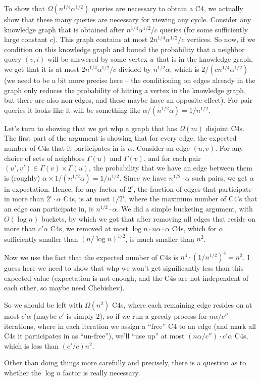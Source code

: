 To show that $\Omega(n^{1/4} \alpha^{1/2})$ queries are necessary to obtain a C4, we actually show that these many queries are necessary for viewing any cycle. Consider any knowledge graph that is obtained after $n^{1/4} \alpha^{1/2}/c$ queries (for some sufficiently large constant $c$). This graph contains at most $2 n^{1/4} \alpha^{1/2}/c$ vertices. So now, if we condition on this knowledge graph and bound the probability that a neighbor query $(v,i)$ will be answered by some vertex $u$ that is in the knowledge graph, we get that it is at most $2 n^{1/4} \alpha^{1/2}/c$ divided by $n^{1/2}\alpha$, which is $2/(cn^{1/4}\alpha^{1/2})$ (we need to be a bit more precise here -- the conditioning on edges already in the graph only reduces the probability of hitting a vertex in the knowledge graph, but there are also non-edges, and these maybe have an opposite effect). For pair queries it looks like it will be something like $\alpha /(n^{1/2}\alpha) = 1/n^{1/2}$.

Let's turn to showing that we get whp a graph that has $\Omega(m)$ disjoint C4s. The first part of the argument is showing that for every edge, the expected number of C4s that it participates in is $\alpha$.
Consider an edge $(u,v)$. For any choice of sets of neighbors $\Gamma(u)$ and $\Gamma(v)$, and for each pair $(u',v') \in \Gamma(v) \times \Gamma(u)$, the probability that we have an edge between them is (roughly) $\alpha \times 1/(n^{1/2}\alpha) = 1/n^{1/2}$. Since we have $n^{1/2} \cdot \alpha$ such pairs, we get  $\alpha$ in expectation. Hence, for any factor of $2^i$, the fraction of edges that participate in more than $2^i\cdot \alpha$ C4s, is at most $1/2^i$, where the maximum number of C4's that an edge can participate in, is $n^{1/2}\cdot \alpha$. We did a simple bucketing argument, with $O(\log n)$ buckets, by which we got that after removing all edges that reside on more than $c' \alpha$ C4s, we removed at most $\log n \cdot n\alpha \cdot \alpha$ C4s, which for $\alpha$ sufficiently smaller than $(n/\log n)^{1/2}$, is much smaller than $n^2$.

Now we use the fact that the expected number of C4s is $n^4 \cdot (1/n^{1/2})^4 = n^2$. I guess here we need to show that whp we won't get significantly less than this expected value (expectation is not enough, and the C4s are not independent of each other, so maybe need Chebishev).

So we should be left with $\Omega(n^2)$ C4s, where each remaining edge resides on at most $c'\alpha$ (maybe $c'$ is simply $ 2$), so if we run a greedy process for $n\alpha/c''$ iterations, where in each iteration we  assign a ``free'' C4 to an edge (and mark all C4s it participates in as ``un-free''), we'll ``use up'' at most $(n \alpha/c'') \cdot c'\alpha$ C4s, which is less than $(c'/c) n^2$.

Other than doing things more carefully and precisely, there is a question as to whether the $\log n$ factor is really necessary.
\fi


